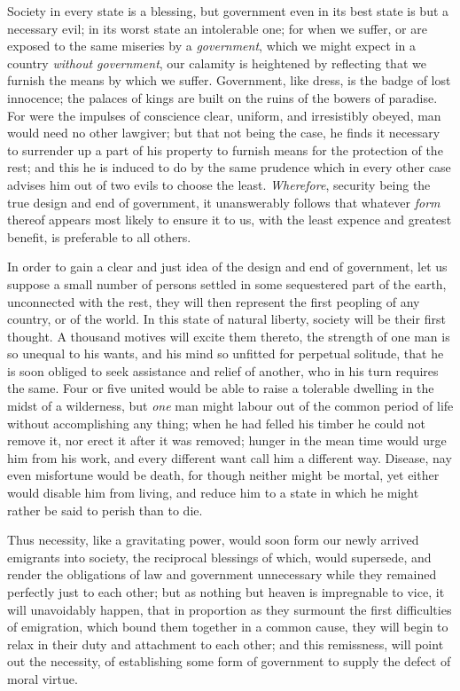 \documentclass[12pt, twocolumn]{book}
\begin{document}
    Society in every state is a blessing, but government even in its best state is but a necessary evil; in its worst state an intolerable one; for when we suffer, or are exposed to the same miseries by a \textit{government}, which we might expect in a country \textit{without government}, our calamity is heightened by reflecting that we furnish the means by which we suffer. Government, like dress, is the badge of lost innocence; the palaces of kings are built on the ruins of the bowers of paradise. For were the impulses of conscience clear, uniform, and irresistibly obeyed, man would need no other lawgiver; but that not being the case, he finds it necessary to surrender up a part of his property to furnish means for the protection of the rest; and this he is induced to do by the same prudence which in every other case advises him out of two evils to choose the least. \textit{Wherefore}, security being the true design and end of government, it unanswerably follows that whatever \textit{form} thereof appears most likely to ensure it to us, with the least expence and greatest benefit, is preferable to all others.

    In order to gain a clear and just idea of the design and end of government, let us suppose a small number of persons settled in some sequestered part of the earth, unconnected with the rest, they will then represent the first peopling of any country, or of the world. In this state of natural liberty, society will be their first thought. A thousand motives will excite them thereto, the strength of one man is so unequal to his wants, and his mind so unfitted for perpetual solitude, that he is soon obliged to seek assistance and relief of another, who in his turn requires the same. Four or five united would be able to raise a tolerable dwelling in the midst of a wilderness, but \textit{one} man might labour out of the common period of life without accomplishing any thing; when he had felled his timber he could not remove it, nor erect it after it was removed; hunger in the mean time would urge him from his work, and every different want call him a different way. Disease, nay even misfortune would be death, for though neither might be mortal, yet either would disable him from living, and reduce him to a state in which he might rather be said to perish than to die.

    Thus necessity, like a gravitating power, would soon form our newly arrived emigrants into society, the reciprocal blessings of which, would supersede, and render the obligations of law and government unnecessary while they remained perfectly just to each other; but as nothing but heaven is impregnable to vice, it will unavoidably happen, that in proportion as they surmount the first difficulties of emigration, which bound them together in a common cause, they will begin to relax in their duty and attachment to each other; and this remissness, will point out the necessity, of establishing some form of government to supply the defect of moral virtue.
\end{document}
